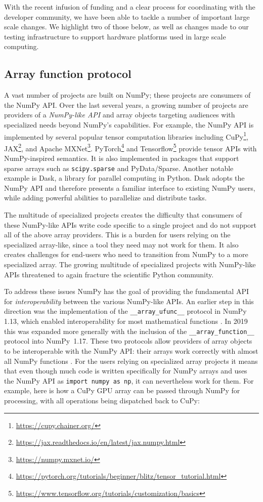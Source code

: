 \documentclass[twocolumn]{article}
\begin{document}
With the recent infusion of funding and a clear process for coordinating with
the developer community, we have been able to tackle a number of important
large scale changes.
We highlight two of those below, as well as changes made to our testing
infrastructure to support hardware platforms used in large scale computing.

\subsection*{Array function protocol}

A vast number of projects are built on NumPy;
these projects are consumers of the NumPy API.
Over the last several years, a growing number of projects are providers of
a \emph{NumPy-like API} and array objects targeting audiences with specialized
needs beyond NumPy's capabilities.
For example, the NumPy API is implemented by several popular tensor computation
libraries including CuPy\footnote{\url{https://cupy.chainer.org/}},
JAX\footnote{\url{https://jax.readthedocs.io/en/latest/jax.numpy.html}},
and Apache MXNet\footnote{\url{https://numpy.mxnet.io/}}.
PyTorch\footnote{\url{https://pytorch.org/tutorials/beginner/blitz/tensor\_tutorial.html}}
and Tensorflow\footnote{\url{https://www.tensorflow.org/tutorials/customization/basics}}
provide tensor APIs with NumPy-inspired semantics.
It is also implemented in packages that support sparse arrays
such as \texttt{scipy.sparse} and PyData/Sparse.
Another notable example is Dask, a library for parallel computing in
Python.  Dask adopts the NumPy API and therefore presents a familiar
interface to existing NumPy users, while adding powerful abilities to
parallelize and distribute tasks.

The multitude of specialized projects creates the difficulty that consumers
of these NumPy-like APIs write code specific to a single project and do not support
all of the above array providers.
This is a burden for users relying on the specialized array-like, since
a tool they need may not work for them.
It also creates challenges for end-users who need to transition
from NumPy to a more specialized array.
The growing multitude of specialized projects with NumPy-like APIs threatened
to again fracture the scientific Python community.

To address these issues NumPy has the goal of providing the fundamental
API for \emph{interoperability} between the various NumPy-like APIs.
An earlier step in this direction was the implementation of the
\texttt{\_\_array\_ufunc\_\_} protocol in NumPy 1.13, which enabled interoperability
for most mathematical functions \cite{NEP13}.
In 2019 this was expanded more generally with the inclusion of the
\texttt{\_\_array\_function\_\_} protocol into NumPy~1.17.
These two protocols allow providers of array objects to be interoperable
with the NumPy API: their arrays work correctly with almost all NumPy functions \cite{NEP18}.
For the users relying on specialized array projects it means that even though
much code is written specifically for NumPy arrays and uses the NumPy API as
\texttt{import numpy as np}, it can nevertheless work for them.
For example, here is how a CuPy GPU array can be passed through NumPy for
processing, with all operations being dispatched back to CuPy:
\end{document}
